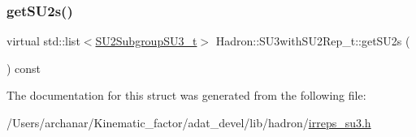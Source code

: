 \mbox{\label{structHadron_1_1SU3withSU2Rep__t_a6bebd41fd203e3340441c04ccc220899}} 
\subsubsection{\texorpdfstring{getSU2s()}{getSU2s()}\hspace{0.1cm}{\footnotesize\ttfamily [2/2]}}
{\footnotesize\ttfamily virtual std\+::list$<$\mbox{\hyperlink{structHadron_1_1SU2SubgroupSU3__t}{S\+U2\+Subgroup\+S\+U3\+\_\+t}}$>$ Hadron\+::\+S\+U3with\+S\+U2\+Rep\+\_\+t\+::get\+S\+U2s (\begin{DoxyParamCaption}{ }\end{DoxyParamCaption}) const\hspace{0.3cm}{\ttfamily [pure virtual]}}



The documentation for this struct was generated from the following file\+:\begin{DoxyCompactItemize}
\item 
/\+Users/archanar/\+Kinematic\+\_\+factor/adat\+\_\+devel/lib/hadron/\mbox{\hyperlink{lib_2hadron_2irreps__su3_8h}{irreps\+\_\+su3.\+h}}\end{DoxyCompactItemize}
